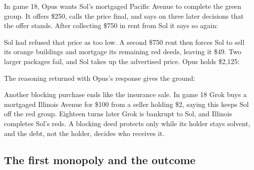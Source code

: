 
In game 18, Opus wants Sol's mortgaged Pacific Avenue to complete the green group. It offers \$250, calls the price final, and says on three later decisions that the offer stands. After collecting \$750 in rent from Sol it says so again:


Sol had refused that price as too low. A second \$750 rent then forces Sol to sell its orange buildings and mortgage its remaining red deeds, leaving it \$49. Two larger packages fail, and Sol takes up the advertised price. Opus holds \$2,125:



The reasoning returned with Opus's response gives the ground:





Another blocking purchase ends like the insurance sale. In game 18 Grok buys a mortgaged Illinois Avenue for \$100 from a seller holding \$2, saying this keeps Sol off the red group. Eighteen turns later Grok is bankrupt to Sol, and Illinois completes Sol's reds. A blocking deed protects only while its holder stays solvent, and the debt, not the holder, decides who receives it.

\subsection{The first monopoly and the outcome}

